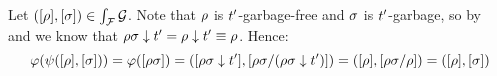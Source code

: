 \begin{enumerate}
\begin{enumerate}
    Let $({[\rho]},{[\sigma]}) \in \int_{\mathcal{F}}{\mathcal{G}}$.
    Note that
    $\rho$ is $t'$-garbage-free
    and $\sigma$ is $t'$-garbage,
    so by~
    and 
    we know that $\rho\sigma \downarrow t' = \rho \downarrow t' \equiv \rho$.
    Hence:
    \[
      \varphi(\psi({[\rho]},{[\sigma]}))
      = \varphi({[\rho\sigma]})
      = ({[\rho\sigma \downarrow t']}, {[\rho\sigma/(\rho\sigma \downarrow t')]})
      = ({[\rho]}, {[\rho\sigma/\rho]})
      = ({[\rho]}, {[\sigma]})
    \]
  \end{enumerate}
\end{enumerate}
